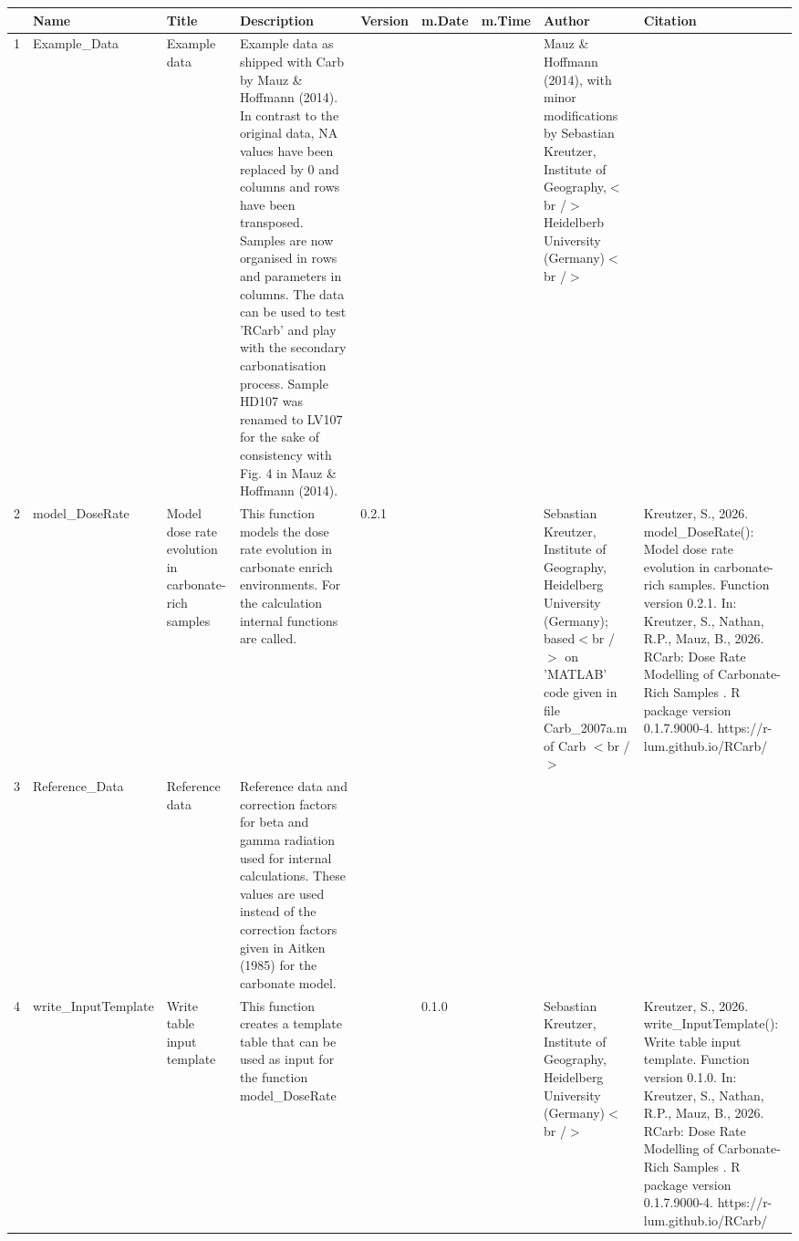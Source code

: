 \begin{table}[ht]
\centering
\begin{tabular}{rllllllll}
  \hline
 & Name & Title & Description & Version & m.Date & m.Time & Author & Citation \\ 
  \hline
1 & Example\_Data & Example data & Example data as shipped with  Carb  by Mauz \& Hoffmann (2014). In contrast to the original data,  NA  values have been replaced by 0 and columns and rows have been transposed. Samples are now organised in rows and parameters in columns.  The data can be used to test  'RCarb'  and play with the secondary carbonatisation process. Sample HD107 was renamed to LV107 for the sake of consistency with Fig. 4 in Mauz \& Hoffmann (2014). &  &  &  & Mauz \& Hoffmann (2014), with minor modifications by Sebastian Kreutzer, Institute of Geography,$<$br /$>$ Heidelberb University (Germany)$<$br /$>$ &  \\ 
  2 & model\_DoseRate & Model dose rate evolution in carbonate-rich samples & This function models the dose rate evolution in carbonate enrich environments. For the calculation internal functions are called. & 0.2.1
 &  &  & Sebastian Kreutzer, Institute of Geography, Heidelberg University (Germany); based$<$br /$>$ on 'MATLAB' code given in file Carb\_2007a.m of  Carb $<$br /$>$ & Kreutzer, S., 2026. model\_DoseRate(): Model dose rate evolution in carbonate-rich samples. Function version 0.2.1. In: Kreutzer, S., Nathan, R.P., Mauz, B., 2026. RCarb: Dose Rate Modelling of Carbonate-Rich Samples . R package version 0.1.7.9000-4. https://r-lum.github.io/RCarb/
 \\ 
  3 & Reference\_Data & Reference data & Reference data and correction factors for beta and gamma radiation used for internal calculations. These values are used instead of the correction factors given in Aitken (1985) for the carbonate model. &  &  &  &  &  \\ 
  4 & write\_InputTemplate & Write table input template & This function creates a template table that can be used as input for the function model\_DoseRate &  & 0.1.0
 &  & Sebastian Kreutzer, Institute of Geography, Heidelberg University (Germany)$<$br /$>$ & Kreutzer, S., 2026. write\_InputTemplate(): Write table input template. Function version 0.1.0. In: Kreutzer, S., Nathan, R.P., Mauz, B., 2026. RCarb: Dose Rate Modelling of Carbonate-Rich Samples . R package version 0.1.7.9000-4. https://r-lum.github.io/RCarb/
 \\ 
   \hline
\end{tabular}
\end{table}

